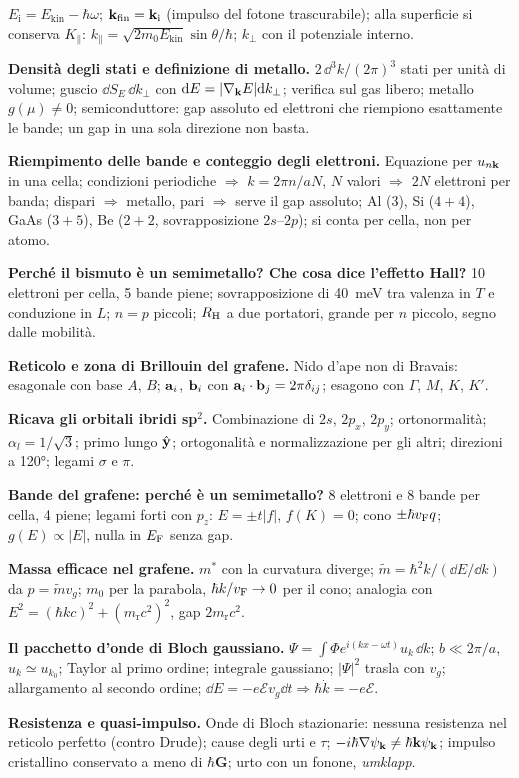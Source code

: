 \documentclass[11pt,a4paper]{article}
\begin{document}
\begin{domande}
$E_{\mathrm i}=E_{\mathrm{kin}}-\hbar\omega$; $\mathbf k_{\mathrm{fin}}=\mathbf k_{\mathrm i}$ (impulso del fotone trascurabile); alla superficie si conserva
$K_\parallel$: $k_\parallel=\sqrt{2m_0E_{\mathrm{kin}}}\sin\theta/\hbar$; $k_\perp$ con il potenziale interno.
\item \textbf{Densità degli stati e definizione di metallo.} $2\,\dd^3k/(2\pi)^3$ stati per unità di volume; guscio $\dd S_E\,\dd k_\perp$ con
$\mathrm d E=|\nabla_{\mathbf k}E|\mathrm d k_\perp$; verifica sul gas libero; metallo $g(\mu)\ne0$; semiconduttore: gap assoluto ed elettroni che riempiono esattamente
le bande; un gap in una sola direzione non basta.
\item \textbf{Riempimento delle bande e conteggio degli elettroni.} Equazione per $u_{n\mathbf k}$ in una cella; condizioni periodiche $\Rightarrow$
$k=2\pi n/aN$, $N$ valori $\Rightarrow$ $2N$ elettroni per banda; dispari $\Rightarrow$ metallo, pari $\Rightarrow$ serve il gap assoluto; Al (3), Si
($4+4$), GaAs ($3+5$), Be ($2+2$, sovrapposizione $2s$--$2p$); si conta per cella, non per atomo.
\item \textbf{Perché il bismuto è un semimetallo? Che cosa dice l'effetto Hall?} 10 elettroni per cella, 5 bande piene; sovrapposizione di
\SI{40}{meV} tra valenza in $T$ e conduzione in $L$; $n=p$ piccoli; $R_{\mathrm H}$ a due portatori, grande per $n$ piccolo, segno dalle mobilità.
\item \textbf{Reticolo e zona di Brillouin del grafene.} Nido d'ape non di Bravais: esagonale con base $A$, $B$; $\mathbf a_i$, $\mathbf b_i$ con $\mathbf a_i\cdot\mathbf b_j=2\pi\delta_{ij}$;
esagono con $\Gamma$, $M$, $K$, $K'$.
\item \textbf{Ricava gli orbitali ibridi sp$^2$.} Combinazione di $2s$, $2p_x$, $2p_y$; ortonormalità; $\alpha_l=1/\sqrt3$; primo lungo $\hat{\mathbf y}$; ortogonalità
e normalizzazione per gli altri; direzioni a \ang{120}; legami $\sigma$ e $\pi$.
\item \textbf{Bande del grafene: perché è un semimetallo?} 8 elettroni e 8 bande per cella, 4 piene; legami forti con $p_z$: $E=\pm t|f|$, $f(K)=0$;
cono $\pm\hbar v_{\mathrm F} q$; $g(E)\propto|E|$, nulla in $E_{\mathrm F}$ senza gap.
\item \textbf{Massa efficace nel grafene.} $m^*$ con la curvatura diverge; $\tilde m=\hbar^2k/(\dd E/\dd k)$ da $p=\tilde mv_g$; $m_0$ per la parabola,
$\hbar k/v_{\mathrm F}\to0$ per il cono; analogia con $E^2=(\hbar kc)^2+(m_{\mathrm r}c^2)^2$, gap $2m_{\mathrm r}c^2$.
\item \textbf{Il pacchetto d'onde di Bloch gaussiano.} $\Psi=\int\Phi e^{i(kx-\omega t)}u_k\,\dd k$; $b\ll2\pi/a$, $u_k\simeq u_{k_0}$; Taylor al primo ordine;
integrale gaussiano; $|\Psi|^2$ trasla con $v_g$; allargamento al secondo ordine; $\dd E=-e\mathcal Ev_g\dd t\Rightarrow\hbar\dot k=-e\mathcal E$.
\item \textbf{Resistenza e quasi-impulso.} Onde di Bloch stazionarie: nessuna resistenza nel reticolo perfetto (contro Drude); cause degli urti e $\tau$;
$-i\hbar\nabla\psi_{\mathbf k}\ne\hbar\mathbf k\psi_{\mathbf k}$; impulso cristallino conservato a meno di $\hbar\mathbf G$; urto con un fonone, \emph{umklapp}.
\end{domande}
\end{document}
